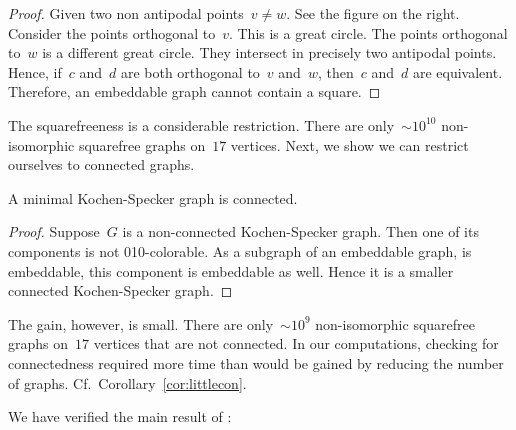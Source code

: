 \documentclass{report}
\begin{document}
\begin{proof}
    Given two non antipodal points~$v\neq w$.
    See the figure on the right.
    Consider the points orthogonal to~$v$.
    This is a great circle.
    The points orthogonal to~$w$ is a different great circle.
    They intersect in precisely two antipodal points.
    Hence, if~$c$ and~$d$ are both orthogonal to~$v$ and~$w$,
    then~$c$ and~$d$ are equivalent.
    Therefore, an embeddable graph cannot contain a square.
\end{proof}

The squarefreeness is a considerable restriction.  There are
only~${\sim}10^{10}$ non-isomorphic squarefree graphs on~$17$
vertices.\cite{sf-sloane}
Next, we show we can restrict ourselves to connected graphs.
\begin{proposition}\label{prop:ks-conn}
    A minimal Kochen-Specker graph is connected.
\end{proposition}
\begin{proof}
    Suppose~$G$ is a non-connected Kochen-Specker graph.
    Then one of its components is not 010-colorable.
    As a subgraph of an embeddable graph, is embeddable,
    this component is embeddable as well.
    Hence it is a smaller connected Kochen-Specker graph.
\end{proof}
The gain, however, is small.
There are only~${\sim}10^9$ non-isomorphic squarefree graphs on~$17$
vertices that are not connected.
In our computations, checking for connectedness
required more time than would be gained by reducing the number of graphs.
Cf.~Corollary~\ref{cor:littlecon}.

We have verified the main result of \cite{aow11}:

\end{document}
